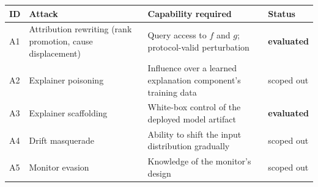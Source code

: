 \begin{tabular}{llp{5.4cm}l}
\toprule
\textbf{ID} & \textbf{Attack} & \textbf{Capability required} & \textbf{Status} \\
\midrule
A1 & Attribution rewriting (rank promotion, cause displacement) & Query access to $f$ and $g$; protocol-valid perturbation & \textbf{evaluated} \\
A2 & Explainer poisoning & Influence over a learned explanation component's training data & scoped out \\
A3 & Explainer scaffolding & White-box control of the deployed model artifact & \textbf{evaluated} \\
A4 & Drift masquerade & Ability to shift the input distribution gradually & scoped out \\
A5 & Monitor evasion & Knowledge of the monitor's design & scoped out \\
\bottomrule
\end{tabular}
